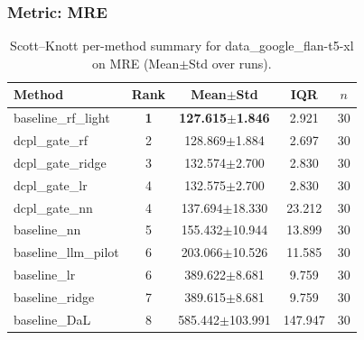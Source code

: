 \subsubsection*{Metric: MRE}
\begin{table}[H]
\centering
\scriptsize
\setlength{\tabcolsep}{4pt}
\renewcommand{\arraystretch}{1.1}
\caption{Scott--Knott per-method summary for data\_google\_flan-t5-xl on MRE (Mean$\pm$Std over runs).}
\label{tab:sk_data_google_flan-t5-xl_MRE}
\begin{tabular}{l|c|c|c|c}
\hline
\textbf{Method} & \textbf{Rank} & \textbf{Mean$\pm$Std} & \textbf{IQR} & \textbf{$n$} \\
\hline
\rowcolor{red!15} baseline\_rf\_light & \textbf{1} & \textbf{127.615$\pm$1.846} & 2.921 & 30 \\
dcpl\_gate\_rf & 2 & 128.869$\pm$1.884 & 2.697 & 30 \\
dcpl\_gate\_ridge & 3 & 132.574$\pm$2.700 & 2.830 & 30 \\
dcpl\_gate\_lr & 4 & 132.575$\pm$2.700 & 2.830 & 30 \\
dcpl\_gate\_nn & 4 & 137.694$\pm$18.330 & 23.212 & 30 \\
baseline\_nn & 5 & 155.432$\pm$10.944 & 13.899 & 30 \\
baseline\_llm\_pilot & 6 & 203.066$\pm$10.526 & 11.585 & 30 \\
baseline\_lr & 6 & 389.622$\pm$8.681 & 9.759 & 30 \\
baseline\_ridge & 7 & 389.615$\pm$8.681 & 9.759 & 30 \\
baseline\_DaL & 8 & 585.442$\pm$103.991 & 147.947 & 30 \\
\hline
\end{tabular}
\end{table}
